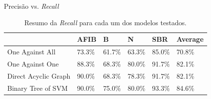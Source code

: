 \documentclass[10pt]{beamer}
\begin{document}
\begin{frame}{Precisão vs. \textit{Recall} }
  \begin{table}
    \centering
    \begin{tabular}{@{}llllll@{}}
      \toprule
                         & AFIB   & B      & N      & SBR    & Average \\ 
    \midrule
    One Against All      & 73.3\% & 61.7\% & 63.3\% & 85.0\% & 70.8\%  \\ 
    One Against One      & 88.3\% & 68.3\% &  80.0\% & 91.7\% & 82.1\%  \\ 
    Direct Acyclic Graph & 90.0\% & 68.3\% & 78.3\% & 91.7\% & 82.1\%  \\ 
    Binary Tree of SVM   & 90.0\% & 75.0\% & 80.0\% & 93.3\% & 84.6\%  \\ 
    \bottomrule
    \end{tabular}
    \caption{Resumo da \textit{Recall} para cada um dos modelos testados.}
    
\end{table}

\end{frame}
\end{document}
